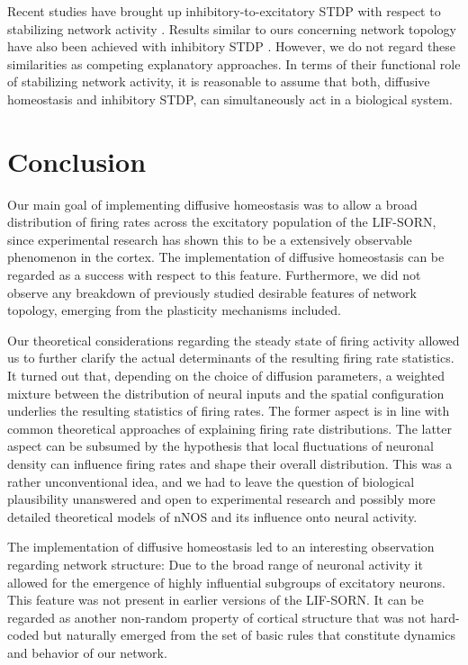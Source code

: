 \documentclass[10pt,letterpaper]{article}
\begin{document}
Recent studies have brought up inhibitory-to-excitatory STDP with respect to stabilizing network activity \cite{Vogels_2011,Luz_2012}. Results similar to ours concerning network topology have also been achieved with inhibitory STDP \cite{Effenberger_2015}. However, we do not regard these similarities as competing explanatory approaches. In terms of their functional role of stabilizing network activity, it is reasonable to assume that both, diffusive homeostasis and inhibitory STDP, can simultaneously act in a biological system.

\section*{Conclusion}
Our main goal of implementing diffusive homeostasis was to allow a broad distribution of firing rates across the excitatory population of the LIF-SORN, since experimental research has shown this to be a extensively observable phenomenon in the cortex. The implementation of diffusive homeostasis can be regarded as a success with respect to this feature. Furthermore, we did not observe any breakdown of previously studied desirable features of network topology, emerging from the plasticity mechanisms included.

Our theoretical considerations regarding the steady state of firing activity allowed us to further clarify the actual determinants of the resulting firing rate statistics. It turned out that, depending on the choice of diffusion parameters, a weighted mixture between the distribution of neural inputs and the spatial configuration underlies the resulting statistics of firing rates. The former aspect is in line with common theoretical approaches of explaining firing rate distributions. The latter aspect can be subsumed by the hypothesis that local fluctuations of neuronal density can influence firing rates and shape their overall distribution. This was a rather unconventional idea, and we had to leave the question of biological plausibility unanswered and open to experimental research and possibly more detailed theoretical models of nNOS and its influence onto neural activity.

The implementation of diffusive homeostasis led to an interesting observation regarding network structure: Due to the broad range of neuronal activity it allowed for the emergence of highly influential subgroups of excitatory neurons. This feature was not present in earlier versions of the LIF-SORN. It can be regarded as another non-random property of cortical structure that was not hard-coded but naturally emerged from the set of basic rules that constitute dynamics and behavior of our network.
\end{document}
